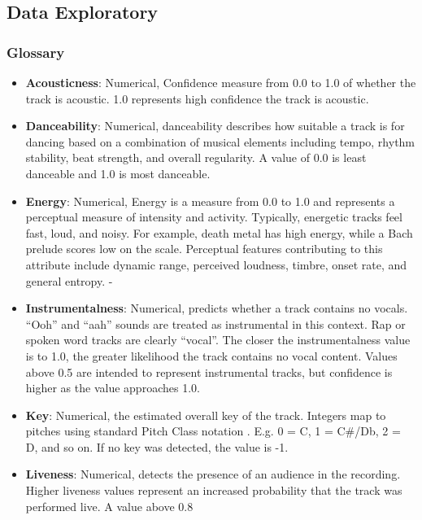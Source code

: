 \documentclass[
]{article}
\providecommand{\tightlist}{%
  \setlength{\itemsep}{0pt}\setlength{\parskip}{0pt}}
\begin{document}
\hypertarget{data-exploratory}{%
\subsection{Data Exploratory}\label{data-exploratory}}

\hypertarget{glossary}{%
\subsubsection{Glossary}\label{glossary}}

\begin{itemize}
\tightlist
\item
  \textbf{Acousticness}: Numerical, Confidence measure from 0.0 to 1.0
  of whether the track is acoustic. 1.0 represents high confidence the
  track is acoustic.
\item
  \textbf{Danceability}: Numerical, danceability describes how suitable
  a track is for dancing based on a combination of musical elements
  including tempo, rhythm stability, beat strength, and overall
  regularity. A value of 0.0 is least danceable and 1.0 is most
  danceable.
\item
  \textbf{Energy}: Numerical, Energy is a measure from 0.0 to 1.0 and
  represents a perceptual measure of intensity and activity. Typically,
  energetic tracks feel fast, loud, and noisy. For example, death metal
  has high energy, while a Bach prelude scores low on the scale.
  Perceptual features contributing to this attribute include dynamic
  range, perceived loudness, timbre, onset rate, and general entropy. -
\item
  \textbf{Instrumentalness}: Numerical, predicts whether a track
  contains no vocals. ``Ooh'' and ``aah'' sounds are treated as
  instrumental in this context. Rap or spoken word tracks are clearly
  ``vocal''. The closer the instrumentalness value is to 1.0, the
  greater likelihood the track contains no vocal content. Values above
  0.5 are intended to represent instrumental tracks, but confidence is
  higher as the value approaches 1.0.
\item
  \textbf{Key}: Numerical, the estimated overall key of the track.
  Integers map to pitches using standard Pitch Class notation . E.g. 0 =
  C, 1 = C\#/Db, 2 = D, and so on. If no key was detected, the value is
  -1.
\item
  \textbf{Liveness}: Numerical, detects the presence of an audience in
  the recording. Higher liveness values represent an increased
  probability that the track was performed live. A value above 0.8

\end{itemize}
\end{document}
